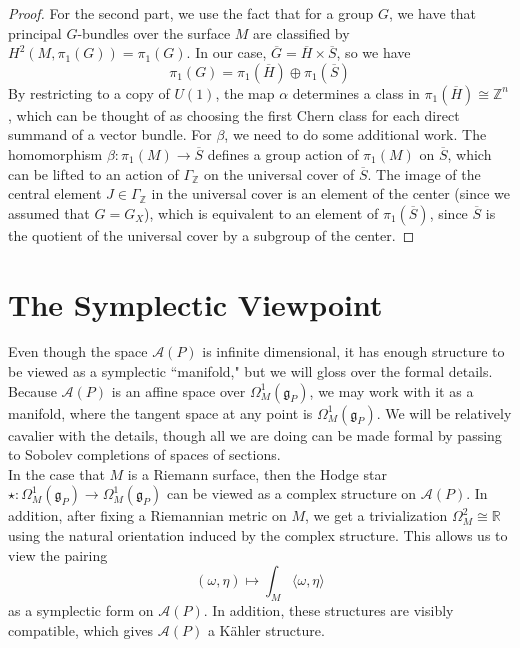 \documentclass[psamsfonts, 12pt]{amsart}
\theoremstyle{definition}
\theoremstyle{remark}
\newcommand{\R}{\mathbb{R}}
\newcommand{\Z}{\mathbb{Z}}
\newcommand{\g}{\mathfrak{g}}
\begin{document}
\begin{proof}
For the second part, we use the fact that for a group $G$, we have that principal
$G$-bundles over the surface $M$ are classified by $H^2(M, \pi_1(G)) = \pi_1(G)$.
In our case, $\overline{G} = \overline{H} \times \overline{S}$, so we have
\[
\pi_1(G) = \pi_1(\overline{H}) \oplus \pi_1(\overline{S})
\]
By restricting to a copy of $U(1)$, the map $\alpha$ determines
a class in $\pi_1(\overline{H}) \cong \Z^n$, which can be thought of as
choosing the first Chern class for each direct summand of a vector bundle.
For $\beta$, we need to do some additional work. The homomorphism
$\beta : \pi_1(M) \to \overline{S}$ defines a group action of $\pi_1(M)$ on
$\overline{S}$, which can be lifted to an action of $\Gamma_\Z$ on the universal
cover of $\overline{S}$. The image of the central element $J \in \Gamma_\Z$ in the
universal cover is an element of the center (since we assumed that $G = G_X$),
which is equivalent to an element of $\pi_1(\overline{S})$, since $\overline{S}$ is
the quotient of the universal cover by a subgroup of the center.
\end{proof}
%
\section{The Symplectic Viewpoint}
%
Even though the space $\mathscr{A}(P)$ is infinite dimensional, it has enough structure
to be viewed as a symplectic ``manifold," but we will gloss over the formal details.
Because $\mathcal{A}(P)$ is an affine space over $\Omega_M^1(\g_P)$, we may
work with it as a manifold, where the tangent space at any point is $\Omega_M^1(\g_P)$.
We will be relatively cavalier with the details, though all we are doing can be made
formal by passing to Sobolev completions of spaces of sections. \\

In the case that $M$ is a Riemann surface, then the Hodge star
$\star : \Omega^1_M(\g_P) \to \Omega^1_M(\g_P)$ can be viewed as a complex
structure on $\mathscr{A}(P)$. In addition, after fixing a Riemannian metric on $M$,
we get a trivialization $\Omega_M^2 \cong \R$ using the natural orientation induced
by the complex structure. This allows us to view the pairing
\[
(\omega,\eta) \mapsto \int_M \langle\omega,\eta\rangle
\]
as a symplectic form on $\mathscr{A}(P)$. In addition, these structures are
visibly compatible, which gives $\mathscr{A}(P)$ a K\"ahler structure. \\
\end{document}
